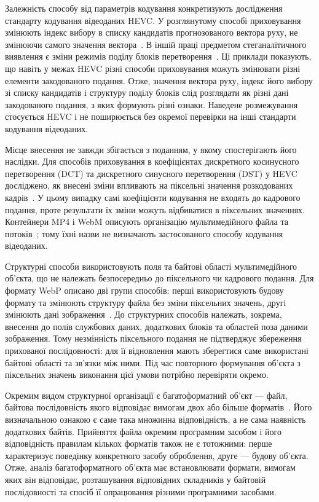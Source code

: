 Залежність способу від параметрів кодування конкретизують дослідження стандарту кодування відеоданих HEVC. У розглянутому способі приховування змінюють індекс вибору в списку кандидатів прогнозованого вектора руху, не змінюючи самого значення вектора~\cite{liu2021hevclocaloptimality}. В іншій праці предметом стеганалітичного виявлення є зміни режимів поділу блоків перетворення~\cite{cao2026hevcpartition}. Ці приклади показують, що навіть у межах HEVC різні способи приховування можуть змінювати різні елементи закодованого подання. Отже, значення вектора руху, індекс його вибору зі списку кандидатів і структуру поділу блоків слід розглядати як різні дані закодованого подання, з яких формують різні ознаки. Наведене розмежування стосується HEVC і не поширюється без окремої перевірки на інші стандарти кодування відеоданих.

Місце внесення не завжди збігається з поданням, у якому спостерігають його наслідки. Для способів приховування в коефіцієнтах дискретного косинусного перетворення (DCT) та дискретного синусного перетворення (DST) у HEVC досліджено, як внесені зміни впливають на піксельні значення розкодованих кадрів~\cite{zhang2022cnnhevc}. У цьому випадку самі коефіцієнти кодування не входять до кадрового подання, проте результати їх зміни можуть відбиватися в піксельних значеннях. Контейнери MP4 і WebM описують організацію мультимедійного файла та потоків~\cite{iso2026isobmff,webm2026container,rfc9559matroska}; тому їхні назви не визначають застосованого способу кодування відеоданих.

Структурні способи використовують поля та байтові області мультимедійного об’єкта, що не належать безпосередньо до піксельного чи кадрового подання. Для формату WebP описано дві групи способів: перші використовують будову формату та змінюють структуру файла без зміни піксельних значень, другі змінюють дані зображення~\cite{koptyra2023webp}. До структурних способів належать, зокрема, внесення до полів службових даних, додаткових блоків та областей поза даними зображення. Тому незмінність піксельного подання не підтверджує збереження прихованої послідовності: для її відновлення мають зберегтися саме використані байтові області та зв’язки між ними. Під час повторного формування об’єкта з піксельних значень виконання цієї умови потрібно перевіряти окремо.

Окремим видом структурної організації є багатоформатний об’єкт --- файл, байтова послідовність якого відповідає вимогам двох або більше форматів~\cite{koch2025polyglot}. Його визначальною ознакою є саме така множинна відповідність, а не сама наявність додаткових байтів. Прийняття файла окремим програмним засобом і його відповідність правилам кількох форматів також не є тотожними: перше характеризує поведінку конкретного засобу оброблення, друге --- будову об’єкта. Отже, аналіз багатоформатного об’єкта має встановлювати формати, вимогам яких він відповідає, розташування відповідних складників у байтовій послідовності та спосіб її опрацювання різними програмними засобами.

